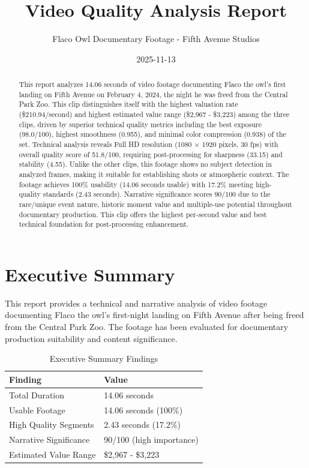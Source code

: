 \documentclass[
  11pt,
]{article}
\title{Video Quality Analysis Report}
\subtitle{Flaco Owl Documentary Footage - Fifth Avenue Studios}
\author{}
\date{2025-11-13}
\begin{document}
\maketitle
\begin{abstract}
This report analyzes 14.06 seconds of video footage documenting Flaco
the owl's first landing on Fifth Avenue on February 4, 2024, the night
he was freed from the Central Park Zoo. This clip distinguishes itself
with the highest valuation rate (\$210.94/second) and highest estimated
value range (\$2,967 - \$3,223) among the three clips, driven by
superior technical quality metrics including the best exposure
(98.0/100), highest smoothness (0.955), and minimal color compression
(0.938) of the set. Technical analysis reveals Full HD resolution (1080
× 1920 pixels, 30 fps) with overall quality score of 51.8/100, requiring
post-processing for sharpness (33.15) and stability (4.55). Unlike the
other clips, this footage shows no subject detection in analyzed frames,
making it suitable for establishing shots or atmospheric context. The
footage achieves 100\% usability (14.06 seconds usable) with 17.2\%
meeting high-quality standards (2.43 seconds). Narrative significance
scores 90/100 due to the rare/unique event nature, historic moment value
and multiple-use potential throughout documentary production. This clip
offers the highest per-second value and best technical foundation for
post-processing enhancement.
\end{abstract}
\ifdefined\Shaded\renewenvironment{Shaded}{\begin{tcolorbox}[borderline west={3pt}{0pt}{shadecolor}, frame hidden, interior hidden, boxrule=0pt, sharp corners, breakable, enhanced]}{\end{tcolorbox}}\fi

\needspace{8cm}
\section{Executive Summary}

This report provides a technical and narrative analysis of video footage
documenting Flaco the owl's first-night landing on Fifth Avenue after
being freed from the Central Park Zoo. The footage has been evaluated
for documentary production suitability and content significance.

\begin{table}[h]
\centering
\small
\caption{Executive Summary Findings}
\label{tab-exec-summary}
\begin{tabular}{p{3cm}p{8cm}}
\toprule
\textbf{Finding} & \textbf{Value} \\
\midrule
Total Duration & 14.06 seconds \\
Usable Footage & 14.06 seconds (100\%) \\
High Quality Segments & 2.43 seconds (17.2\%) \\
Narrative Significance & 90/100 (high importance) \\
Estimated Value Range & \$2,967 - \$3,223 \\
\bottomrule
\end{tabular}
\end{table}
\end{document}
